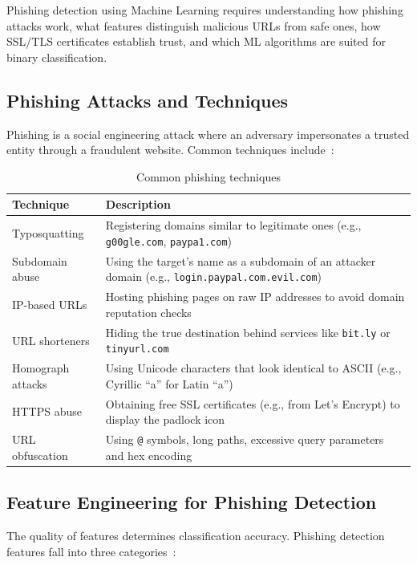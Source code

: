 \documentclass[11pt,a4paper]{article}
\begin{document}
Phishing detection using Machine Learning requires understanding how phishing attacks work, what features distinguish malicious URLs from safe ones, how SSL/TLS certificates establish trust, and which ML algorithms are suited for binary classification.

\subsection{Phishing Attacks and Techniques}

Phishing is a social engineering attack where an adversary impersonates a trusted entity through a fraudulent website. Common techniques include~\cite{aleroud2017,khonji2013}:

\begin{table}[H]
\centering
\begin{tabularx}{\textwidth}{@{}p{3.5cm}L@{}}
\toprule
\textbf{Technique} & \textbf{Description} \\ \midrule
Typosquatting & Registering domains similar to legitimate ones (e.g., \texttt{g00gle.com}, \texttt{paypa1.com}) \\
Subdomain abuse & Using the target's name as a subdomain of an attacker domain (e.g., \texttt{login.paypal.com.evil.com}) \\
IP-based URLs & Hosting phishing pages on raw IP addresses to avoid domain reputation checks \\
URL shorteners & Hiding the true destination behind services like \texttt{bit.ly} or \texttt{tinyurl.com} \\
Homograph attacks & Using Unicode characters that look identical to ASCII (e.g., Cyrillic ``a'' for Latin ``a'') \\
HTTPS abuse & Obtaining free SSL certificates (e.g., from Let's Encrypt) to display the padlock icon \\
URL obfuscation & Using \texttt{@} symbols, long paths, excessive query parameters and hex encoding \\ \bottomrule
\end{tabularx}
\caption{Common phishing techniques}
\end{table}

\subsection{Feature Engineering for Phishing Detection}

The quality of features determines classification accuracy. Phishing detection features fall into three categories~\cite{sahingoz2019,mohammad2014}:
\end{document}
